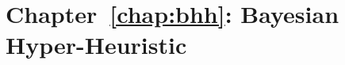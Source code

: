 \section{Chapter~\ref{chap:bhh}: Bayesian Hyper-Heuristic}
\label{sec:symbols:bhh}

\begin{description}
	\item [\parbox{1cm}{$\alpha_{1}$}]
	\item [\parbox{1cm}{$\alpha_{k}$}]
	\item [\parbox{1cm}{$\alpha_{K}$}]
	\item [\parbox{1cm}{$\alpha$}]
	\item [\parbox{1cm}{$\beta_{1}$}]
	\item [\parbox{1cm}{$\beta_{2}$}]
	\item [\parbox{1cm}{$\beta_{j,k}$}]
	\item [\parbox{1cm}{$\beta_{K}^{J}$}]
	\item [\parbox{1cm}{$\beta$}]
	\item [\parbox{1cm}{$\boldsymbol{\alpha}$}]
	\item [\parbox{1cm}{$\boldsymbol{\beta}$}]
	\item [\parbox{1cm}{$\boldsymbol{\gamma}$}]
	\item [\parbox{1cm}{$\boldsymbol{\hat{\phi}}$}]
	\item [\parbox{1cm}{$\boldsymbol{\hat{\psi}}$}]
	\item [\parbox{1cm}{$\boldsymbol{\hat{\theta}}$}]
	\item [\parbox{1cm}{$\boldsymbol{\lambda}$}]
	\item [\parbox{1cm}{$\boldsymbol{\phi}$}]
	\item [\parbox{1cm}{$\boldsymbol{\psi}$}]
	\item [\parbox{1cm}{$\boldsymbol{\theta}$}]
	\item [\parbox{1cm}{$\boldsymbol{C}$}]
	\item [\parbox{1cm}{$\boldsymbol{E}$}]
	\item [\parbox{1cm}{$\boldsymbol{H}$}]
	\item [\parbox{1cm}{$\epsilon(-1)$}]
	\item [\parbox{1cm}{$\epsilon$}]
	\item [\parbox{1cm}{$\eta$}]
	\item [\parbox{1cm}{$\gamma_{0}$}]
	\item [\parbox{1cm}{$\gamma_{1,k}$}]
	\item [\parbox{1cm}{$\gamma_{1}$}]
	\item [\parbox{1cm}{$\gamma_{2,k}$}]

\end{description}
